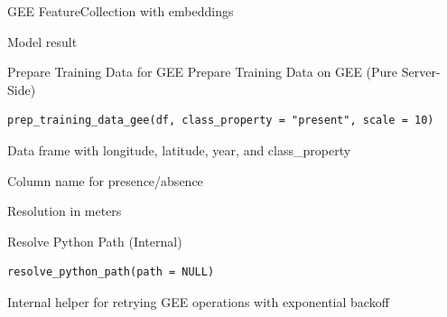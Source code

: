 \documentclass[letterpaper]{book}
\begin{document}
%
\begin{Arguments}
\begin{ldescription}
\item[\code{fc}] GEE FeatureCollection with embeddings

\item[\code{model\_res}] Model result
\end{ldescription}
\end{Arguments}
%
\begin{Description}
Prepare Training Data for GEE
Prepare Training Data on GEE (Pure Server-Side)
\end{Description}
%
\begin{Usage}
\begin{verbatim}
prep_training_data_gee(df, class_property = "present", scale = 10)
\end{verbatim}
\end{Usage}
%
\begin{Arguments}
\begin{ldescription}
\item[\code{df}] Data frame with longitude, latitude, year, and class\_property

\item[\code{class\_property}] Column name for presence/absence

\item[\code{scale}] Resolution in meters
\end{ldescription}
\end{Arguments}
%
\begin{Description}
Resolve Python Path (Internal)
\end{Description}
%
\begin{Usage}
\begin{verbatim}
resolve_python_path(path = NULL)
\end{verbatim}
\end{Usage}
%
\begin{Description}
Internal helper for retrying GEE operations with exponential backoff
\end{Description}
\end{document}
